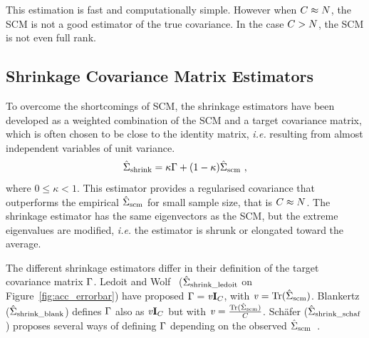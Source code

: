 This estimation is fast and computationally simple.
However when $C \approx N$, the SCM is not a good estimator of the true covariance. 
In the case $C > N$, the SCM is not even full rank.

\subsection{Shrinkage Covariance Matrix Estimators}

To overcome the shortcomings of SCM, the shrinkage estimators have been developed as a weighted combination of the SCM and a target covariance matrix, which is often chosen to be close to the identity matrix, \textit{i.e.} resulting from almost independent variables of unit variance.
\begin{equation}
	\label{eq:shrink}
	\cov{shrink} = \kappa \tarco +(1-\kappa)\cov{scm} \ ,
\end{equation} 
where $0 \leqslant \kappa < 1$.
This estimator provides a regularised covariance that outperforms the empirical $\hat{\Sigma}_{\operatorname{scm}}$ for small sample size, that is $C \approx N$. 
The shrinkage estimator has the same eigenvectors as the SCM, but the extreme eigenvalues are modified, \textit{i.e.} the estimator is shrunk or elongated toward the average.

The different shrinkage estimators differ in their definition of the target covariance matrix $\Gamma$. 
Ledoit and Wolf~\citep{ledoit_well-conditioned_2004} ($\hat{\Sigma}_{\operatorname{shrink\_ledoit}}$ on Figure~\ref{fig:acc_errorbar}) have proposed $\Gamma=\mathit{v}\mathbf{I}_{C}$, with $\mathit{v} = \text{Tr}(\hat{\Sigma}_{\operatorname{scm}})$. 
Blankertz~\citep{blankertz_single-trial_2011} ($\hat{\Sigma}_{\operatorname{shrink\_blank}}$) defines $\Gamma$ also as $\mathit{v}\mathbf{I}_{C}$ but with $\mathit{v} = \frac{\text{Tr}(\hat{\Sigma}_{\operatorname{scm}})}{C}$. 
Sch\"{a}fer ($\hat{\Sigma}_{\operatorname{shrink\_schaf}}$) proposes several ways of defining $\Gamma$ depending on the observed $\hat{\Sigma}_{\operatorname{scm}}$~\citep{schafer_shrinkage_2005}.

